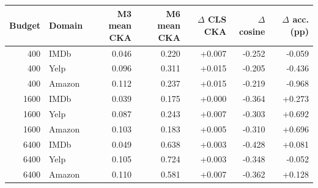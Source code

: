 \begin{tabular}{rlrrrrr}\toprule
Budget & Domain & M3 mean CKA & M6 mean CKA & $\Delta$ CLS CKA & $\Delta$ cosine & $\Delta$ acc. (pp)\\\midrule
400 & IMDb & 0.046 & 0.220 & +0.007 & -0.252 & -0.059 \\
400 & Yelp & 0.096 & 0.311 & +0.015 & -0.205 & -0.436 \\
400 & Amazon & 0.112 & 0.237 & +0.015 & -0.219 & -0.968 \\
1600 & IMDb & 0.039 & 0.175 & +0.000 & -0.364 & +0.273 \\
1600 & Yelp & 0.087 & 0.243 & +0.007 & -0.303 & +0.692 \\
1600 & Amazon & 0.103 & 0.183 & +0.005 & -0.310 & +0.696 \\
6400 & IMDb & 0.049 & 0.638 & +0.003 & -0.428 & +0.081 \\
6400 & Yelp & 0.105 & 0.724 & +0.003 & -0.348 & -0.052 \\
6400 & Amazon & 0.110 & 0.581 & +0.007 & -0.362 & +0.128 \\
\bottomrule\end{tabular}
